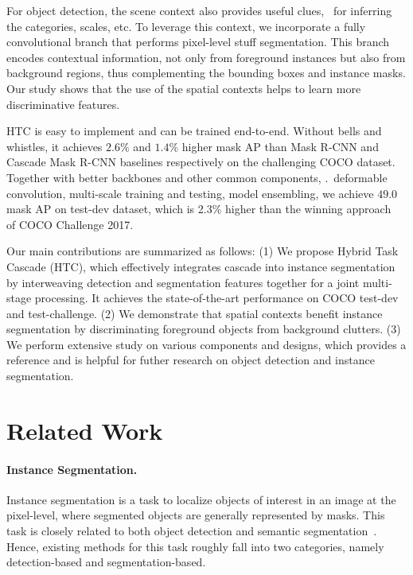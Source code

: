 \documentclass[10pt,twocolumn,letterpaper]{article}
\begin{document}
For object detection, the scene context also provides useful clues,
\eg~for inferring the categories, scales, etc. To leverage this context, we
incorporate a fully convolutional branch that performs pixel-level stuff
segmentation. This branch encodes contextual information, not only from foreground
instances but also from background regions, thus complementing the bounding boxes
and instance masks. Our study shows that the use of the spatial contexts helps
to learn more discriminative features.













HTC is easy to implement and can be trained end-to-end.
Without bells and whistles, it achieves $2.6\%$ and $1.4\%$ higher mask AP than
Mask R-CNN and Cascade Mask R-CNN baselines respectively on the challenging COCO dataset.
Together with better backbones and other common components, \eg.~deformable convolution,
multi-scale training and testing, model ensembling, we achieve $49.0$ mask AP on test-dev dataset,
which is 2.3\% higher than the winning approach~\cite{liu2018path} of COCO Challenge 2017.

Our main contributions are summarized as follows:
(1) We propose Hybrid Task Cascade (HTC), which effectively integrates cascade into instance segmentation by interweaving detection and segmentation features together for a joint multi-stage processing.
It achieves the state-of-the-art performance on COCO test-dev and test-challenge.
(2) We demonstrate that spatial contexts benefit instance segmentation by discriminating foreground objects from background clutters.
(3) We perform extensive study on various components and designs, which provides a reference and is helpful for futher research on object detection and instance segmentation.

 

\section{Related Work}

\paragraph{Instance Segmentation.}
Instance segmentation is a task to localize objects of interest in an image
at the pixel-level, where segmented objects are generally represented by
masks. This task is closely related to both object detection and semantic
segmentation~\cite{liu2015semantic, li2017not}. Hence, existing methods for this task roughly fall into
two categories, namely detection-based and segmentation-based.
\end{document}
